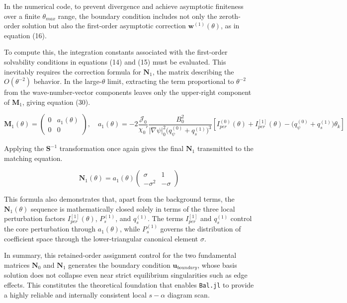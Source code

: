 \documentclass[11pt,a4paper]{article}
\begin{document}
In the numerical code, to prevent divergence and achieve asymptotic finiteness over
a finite \(\theta_{max}\) range, the boundary condition includes not only the
zeroth-order solution but also the first-order asymptotic correction
\(\mathbf{w}^{(1)}(\theta)\), as in equation (16).

To compute this, the integration constants associated with the first-order
solvability conditions in equations (14) and (15) must be evaluated. This
inevitably requires the correction formula for \(\mathbf{N}_1\), the matrix
describing the \(O(\theta^{-2})\) behavior. In the large-\(\theta\) limit, extracting
the term proportional to \(\theta^{-2}\) from the wave-number-vector components
leaves only the upper-right component of \(\mathbf{M}_1\), giving equation (30).

\[ \mathbf{M}_1(\theta) = \begin{pmatrix} 0 & a_1(\theta) \\ 0 & 0 \end{pmatrix}, \quad a_1(\theta) = -2\frac{\mathcal{J}_0}{\chi_0'} \frac{B_0^2}{|\nabla\psi|_0^2\bigl(q_\psi^{(0)}+q_s^{(1)}\bigr)^3} \left[ I_{per}^{(0)}(\theta)+I_{per}^{[1]}(\theta) - \bigl(q_\psi^{(0)}+q_s^{(1)}\bigr)\theta_k \right] \tag{30} \]

Applying the \(\mathbf{S}^{-1}\) transformation once again gives the final
\(\mathbf{N}_1\) transmitted to the matching equation.

\[ \mathbf{N}_1(\theta) = a_1(\theta) \begin{pmatrix} \sigma & 1 \\ -\sigma^2 & -\sigma \end{pmatrix} \tag{31} \]

This formula also demonstrates that, apart from the background terms, the
\(\mathbf{N}_1(\theta)\) sequence is mathematically closed solely in terms of the
three local perturbation factors \(I_{per}^{[1]}(\theta)\), \(P_s^{(1)}\), and
\(q_s^{(1)}\). The terms \(I_{per}^{[1]}\) and \(q_s^{(1)}\) control the core
perturbation through \(a_1(\theta)\), while \(P_s^{(1)}\) governs the distribution
of coefficient space through the lower-triangular canonical element \(\sigma\).

In summary, this retained-order assignment control for the two fundamental
matrices \(\mathbf{N}_0\) and \(\mathbf{N}_1\) generates the boundary condition
\(\mathbf{u}_{boundary}\), whose basis solution does not collapse even near strict
equilibrium singularities such as edge effects. This constitutes the theoretical
foundation that enables \texttt{Bal.jl} to provide a highly reliable and internally
consistent local \(s-\alpha\) diagram scan.
\end{document}
